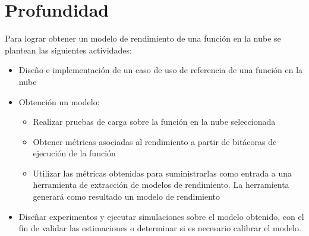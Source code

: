 \section{Profundidad}
Para lograr obtener un modelo de rendimiento de una función en la nube se plantean las siguientes actividades:
\begin{itemize}
    \item Diseño e implementación de un caso de uso de referencia de una función en la nube 
    \item Obtención un modelo:
    \begin{itemize}
        \item Realizar pruebas de carga sobre la función en la nube seleccionada
        \item Obtener métricas asociadas al rendimiento a partir de bitácoras de ejecución de la función
        \item Utilizar las métricas obtenidas para suministrarlas como entrada a una herramienta de extracción de modelos de rendimiento. La herramienta generará como resultado un modelo de rendimiento
    \end{itemize}
    \item Diseñar experimentos y ejecutar simulaciones sobre el modelo obtenido, con el fin de validar las estimaciones o determinar si es necesario calibrar el modelo.
    
\end{itemize}




